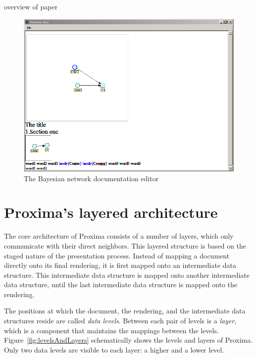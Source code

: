 \documentclass[12pt]{article}
\begin{document}
overview of paper 
\bc
\begin{figure}[ht]
\centering
\includegraphics[width=\textwidth]{images/screenshots/BayesDocEditor}
\caption{The Bayesian network documentation editor}
\label{fig:bayesEditor}
\end{figure}
\ec

%
\section{Proxima's layered architecture} \label{sec:architecture}
%

The core architecture of Proxima consists of a number of layers, which only communicate with their direct neighbors. This layered structure is based on the staged nature of the presentation process. Instead of mapping a document directly onto its final rendering, it is first mapped onto an intermediate data structure. This intermediate data structure is mapped onto another intermediate data structure, until the last intermediate data structure is mapped onto the rendering.

The positions at which the document, the rendering, and the intermediate data structures reside are called {\em data levels}. Between each pair of levels is a {\em layer}, which is a component that maintains the mappings between the levels. Figure~\ref{fig:levelsAndLayers} schematically shows the levels and layers of Proxima. Only two data levels are visible to each layer: a higher and a lower level.
\end{document}
